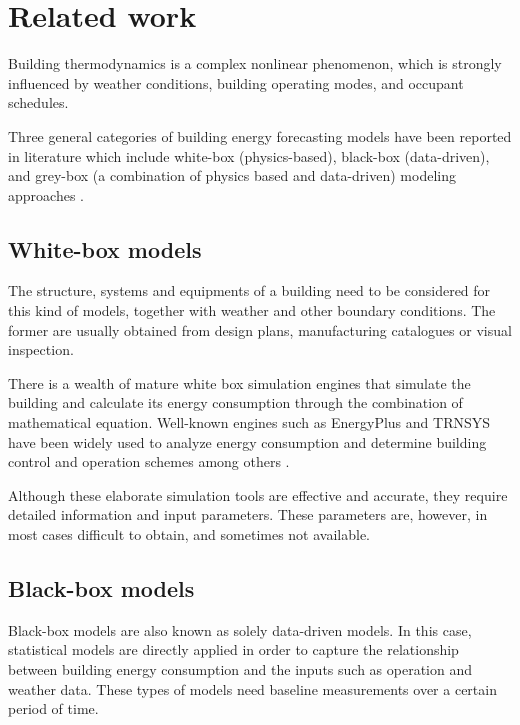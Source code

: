 \documentclass[10pt, conference, compsocconf]{IEEEtran}
\begin{document}


\section{Related work}

Building thermodynamics is a complex nonlinear phenomenon, which is strongly influenced by weather conditions, building operating modes, and occupant schedules.

Three general categories of building energy forecasting models have been reported in literature which include white-box (physics-based), black-box (data-driven), and grey-box (a combination of physics based and data-driven) modeling approaches \cite{li2014review}.

\subsection{White-box models}


The structure, systems and equipments of a building need to be considered for this kind of models, together with weather and other boundary conditions. The former are usually obtained from design plans, manufacturing catalogues or visual inspection.

There is a wealth of mature white box simulation engines that simulate the building and calculate its energy consumption through the combination of mathematical equation. Well-known engines such as EnergyPlus \cite{crawley2001energyplus} and TRNSYS \cite{TRNSYS} have been widely used to analyze energy consumption and determine building control and operation schemes among others \cite{crawley2008contrasting}.

Although these elaborate simulation tools are effective and accurate, they require detailed information and input parameters. These parameters are, however, in most cases difficult to obtain, and sometimes not available.

\subsection{Black-box models}


Black-box models are also known as solely data-driven models. In this case, statistical models are directly applied in order to capture the relationship between building energy consumption and the inputs such as operation and weather data. These types of models need baseline measurements over a certain period of time.
\end{document}
